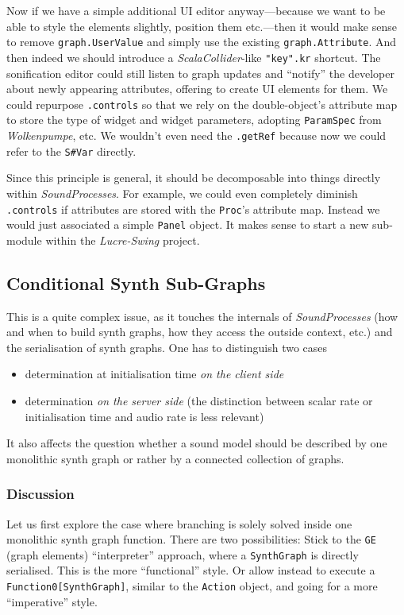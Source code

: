 \documentclass[11pt,a4paper]{article}
\newcommand{\software}[1]{\textit{#1}}
\begin{document}
Now if we have a simple additional UI editor anyway---because we want to be able to style the elements slightly, position them etc.---then it would make sense to remove \verb!graph.UserValue! and simply use the existing \verb!graph.Attribute!. And then indeed we should introduce a \software{ScalaCollider}-like \verb!"key".kr! shortcut. The sonification editor could still listen to graph updates and ``notify'' the developer about newly appearing attributes, offering to create UI elements for them. We could repurpose \verb!.controls! so that we rely on the double-object's attribute map to store the type of widget and widget parameters, adopting \verb!ParamSpec! from \software{Wolkenpumpe}, etc. We wouldn't even need the \verb!.getRef! because now we could refer to the \verb!S#Var! directly.

Since this principle is general, it should be decomposable into things directly within \software{SoundProcesses}. For example, we could even completely diminish \verb!.controls! if attributes are stored with the \verb!Proc!'s attribute map. Instead we would just associated a simple \verb!Panel! object. It makes sense to start a new sub-module within the \software{Lucre-Swing} project.

\subsection{Conditional Synth Sub-Graphs}

This is a quite complex issue, as it touches the internals of \software{SoundProcesses} (how and when to build synth graphs, how they access the outside context, etc.) and the serialisation of synth graphs. One has to distinguish two cases
%
\begin{itemize}
\item determination at initialisation time \emph{on the client side}
\item determination \emph{on the server side} (the distinction between scalar rate or initialisation time and audio rate is less relevant)
\end{itemize}
%
It also affects the question whether a sound model should be described by one monolithic synth graph or rather by a connected collection of graphs.

\subsubsection*{Discussion}

Let us first explore the case where branching is solely solved inside one monolithic synth graph function. There are two possibilities: Stick to the \verb!GE! (graph elements) ``interpreter'' approach, where a \verb!SynthGraph! is directly serialised. This is the more ``functional'' style. Or allow instead to execute a \verb!Function0[SynthGraph]!, similar to the \verb!Action! object, and going for a more ``imperative'' style.
\end{document}
